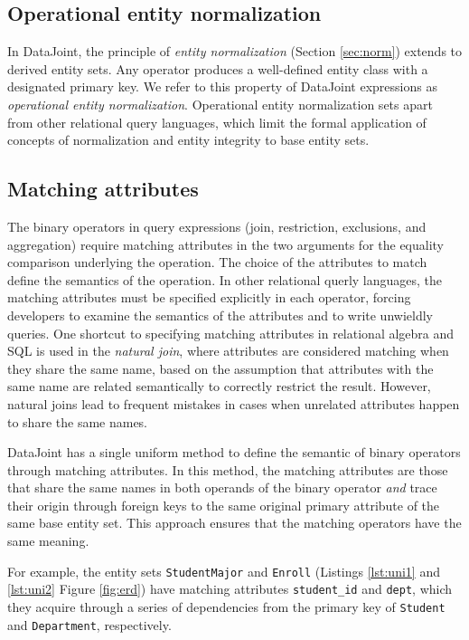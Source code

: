 \documentclass[letter,10pt]{article}
\newcommand{\datajoint}{DataJoint\xspace}
\begin{document}
\subsection{Operational entity normalization}\label{sec:operational}
In \datajoint, the principle of \emph{entity normalization} (Section \ref{sec:norm}) extends to derived entity sets.
Any operator produces a well-defined entity class with a designated primary key. 
We refer to this property of \datajoint expressions as \emph{operational entity normalization}. 
Operational entity normalization sets apart from other relational query languages, which limit the formal application of concepts of normalization and entity integrity to base entity sets.

\subsection{Matching attributes}\label{sec:match}
The binary operators in query expressions (join, restriction,  exclusions, and aggregation) require matching attributes in the two arguments for the equality comparison underlying the operation. 
The choice of the attributes to match define the semantics of the operation. 
In other relational querly languages, the matching attributes must be specified explicitly in each operator, forcing developers to examine the semantics of the attributes and to write unwieldly queries.
One shortcut to specifying matching attributes in relational algebra and SQL is used in the \emph{natural join}, where attributes are considered matching when they share the same name, based on the assumption that attributes with the same name are related semantically to correctly restrict the result.
However, natural joins lead to frequent mistakes in cases when unrelated attributes happen to share the same names.

\datajoint has a single uniform method to define the semantic of binary operators through matching attributes.  
In this method, the matching attributes are those that share the same names in both operands of the binary operator \emph{and} trace their origin through foreign keys to the same original primary attribute of the same base entity set.
This approach ensures that the matching operators have the same meaning. 

For example, the entity sets \lstinline$StudentMajor$ and \lstinline$Enroll$ (Listings \ref{lst:uni1} and \ref{lst:uni2} Figure \ref{fig:erd}) have matching attributes \lstinline$student_id$ and \lstinline$dept$, which they acquire through a series of dependencies from the primary key of \lstinline$Student$ and \lstinline$Department$, respectively.  
\end{document}
